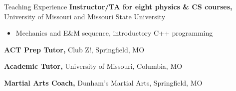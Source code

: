 \begin{rubric}{Teaching Experience}
    \entry*[2018 -- 2022]%
        \textbf{Instructor/TA for eight physics \& CS courses,} University of Missouri and Missouri State University
        \begin{itemize}
            \item Mechanics and E\&M sequence, introductory C++ programming
        \end{itemize}
    
    \entry*[2018 -- 2021]%
        \textbf{ACT Prep Tutor,} Club Z!, Springfield, MO
    
    \entry*[2021 -- Present]%
        \textbf{Academic Tutor,} University of Missouri, Columbia, MO
    
    \entry*[2014 -- 2020]%
        \textbf{Martial Arts Coach,} Dunham's Martial Arts, Springfield, MO
\end{rubric}
